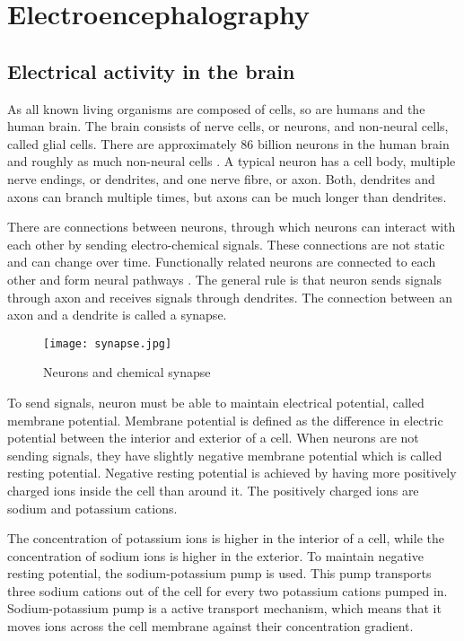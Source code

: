 
\chapter{Electroencephalography}
\section{Electrical activity in the brain}

As all known living organisms are composed of cells, so are humans and the human brain. The brain consists of nerve cells, or neurons, and non-neural cells, called glial cells. There are approximately 86 billion neurons in the human brain and roughly as much non-neural cells \cite{neuroncount}. A typical neuron has a cell body, multiple nerve endings, or dendrites, and one nerve fibre, or axon. Both, dendrites and axons can branch multiple times, but axons can be much longer than dendrites. 

There are connections between neurons, through which neurons can interact with each other by sending electro-chemical signals. These connections are not static and can change over time. Functionally related neurons are connected to each other and form neural pathways \cite{neuralpathway}. The general rule is that neuron sends signals through axon and receives signals through dendrites. The connection between an axon and a dendrite is called a synapse. 

\begin{figure}[b!]
\centering
\texttt{[image: synapse.jpg]}
\caption{Neurons and chemical synapse\cite[p.~17]{neuronpic}}
\label{synapse}
\end{figure}

To send signals, neuron must be able to maintain electrical potential, called membrane potential. Membrane potential is defined as the difference in electric potential between the interior and exterior of a cell. When neurons are not sending signals, they have slightly negative membrane potential which is called resting potential. Negative resting potential is achieved by having more positively charged ions inside the cell than around it. The positively charged ions are sodium and potassium cations.

The concentration of potassium ions is higher in the interior of a cell, while the concentration of sodium ions is higher in the exterior. To maintain negative resting potential, the sodium-potassium pump is used. This pump transports three sodium cations out of the cell for every two potassium cations pumped in. Sodium-potassium pump is a active transport mechanism, which means that it moves ions across the cell membrane against their concentration gradient.

